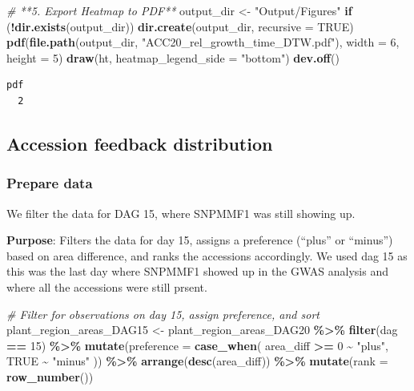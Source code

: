 \documentclass[
  11pt,
]{article}
\newenvironment{Shaded}{\begin{snugshade}}{\end{snugshade}}
\newcommand{\AttributeTok}[1]{\textcolor[rgb]{0.13,0.29,0.53}{#1}}
\newcommand{\CommentTok}[1]{\textcolor[rgb]{0.56,0.35,0.01}{\textit{#1}}}
\newcommand{\ConstantTok}[1]{\textcolor[rgb]{0.56,0.35,0.01}{#1}}
\newcommand{\ControlFlowTok}[1]{\textcolor[rgb]{0.13,0.29,0.53}{\textbf{#1}}}
\newcommand{\DecValTok}[1]{\textcolor[rgb]{0.00,0.00,0.81}{#1}}
\newcommand{\FunctionTok}[1]{\textcolor[rgb]{0.13,0.29,0.53}{\textbf{#1}}}
\newcommand{\NormalTok}[1]{#1}
\newcommand{\OtherTok}[1]{\textcolor[rgb]{0.56,0.35,0.01}{#1}}
\newcommand{\SpecialCharTok}[1]{\textcolor[rgb]{0.81,0.36,0.00}{\textbf{#1}}}
\newcommand{\StringTok}[1]{\textcolor[rgb]{0.31,0.60,0.02}{#1}}
\begin{document}
\begin{Shaded}
\begin{Highlighting}[]
\CommentTok{\# **5. Export Heatmap to PDF**}
\NormalTok{output\_dir }\OtherTok{\textless{}{-}} \StringTok{"Output/Figures"}
\ControlFlowTok{if}\NormalTok{ (}\SpecialCharTok{!}\FunctionTok{dir.exists}\NormalTok{(output\_dir)) }\FunctionTok{dir.create}\NormalTok{(output\_dir, }\AttributeTok{recursive =} \ConstantTok{TRUE}\NormalTok{)}
\FunctionTok{pdf}\NormalTok{(}\FunctionTok{file.path}\NormalTok{(output\_dir, }\StringTok{"ACC20\_rel\_growth\_time\_DTW.pdf"}\NormalTok{), }\AttributeTok{width =} \DecValTok{6}\NormalTok{, }\AttributeTok{height =} \DecValTok{5}\NormalTok{)}
\FunctionTok{draw}\NormalTok{(ht, }\AttributeTok{heatmap\_legend\_side =} \StringTok{"bottom"}\NormalTok{)}
\FunctionTok{dev.off}\NormalTok{()}
\end{Highlighting}
\end{Shaded}

\begin{verbatim}
pdf 
  2 
\end{verbatim}

\subsection{Accession feedback
distribution}\label{accession-feedback-distribution}

\subsubsection{Prepare data}\label{prepare-data-1}

We filter the data for DAG 15, where SNPMMF1 was still showing up.

\textbf{Purpose}: Filters the data for day 15, assigns a preference
(``plus'' or ``minus'') based on area difference, and ranks the
accessions accordingly. We used dag 15 as this was the last day where
SNPMMF1 showed up in the GWAS analysis and where all the accessions were
still prsent.

\begin{Shaded}
\begin{Highlighting}[]
\CommentTok{\# Filter for observations on day 15, assign preference, and sort}
\NormalTok{plant\_region\_areas\_DAG15 }\OtherTok{\textless{}{-}}\NormalTok{ plant\_region\_areas\_DAG20 }\SpecialCharTok{\%\textgreater{}\%}
  \FunctionTok{filter}\NormalTok{(dag }\SpecialCharTok{==} \DecValTok{15}\NormalTok{) }\SpecialCharTok{\%\textgreater{}\%}
  \FunctionTok{mutate}\NormalTok{(}\AttributeTok{preference =} \FunctionTok{case\_when}\NormalTok{(}
\NormalTok{    area\_diff }\SpecialCharTok{\textgreater{}=} \DecValTok{0} \SpecialCharTok{\textasciitilde{}} \StringTok{"plus"}\NormalTok{,}
    \ConstantTok{TRUE} \SpecialCharTok{\textasciitilde{}} \StringTok{"minus"}
\NormalTok{  )) }\SpecialCharTok{\%\textgreater{}\%}
  \FunctionTok{arrange}\NormalTok{(}\FunctionTok{desc}\NormalTok{(area\_diff)) }\SpecialCharTok{\%\textgreater{}\%}
  \FunctionTok{mutate}\NormalTok{(}\AttributeTok{rank =} \FunctionTok{row\_number}\NormalTok{())}
\end{Highlighting}
\end{Shaded}
\end{document}
